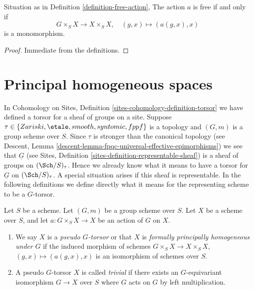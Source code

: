 \begin{lemma}
\label{lemma-free-action}
Situation as in Definition \ref{definition-free-action},
The action $a$ is free if and only if
$$
G \times_S X \to X \times_S X, \quad (g, x) \mapsto (a(g, x), x)
$$
is a monomorphism.
\end{lemma}

\begin{proof}
Immediate from the definitions.
\end{proof}






\section{Principal homogeneous spaces}
\label{section-principal-homogeneous}

\noindent
In
Cohomology on Sites, Definition \ref{sites-cohomology-definition-torsor}
we have defined a torsor for a sheaf of groups on a site.
Suppose $\tau \in \{Zariski, \etale, smooth, syntomic, fppf\}$ is a
topology and $(G, m)$ is a group scheme over $S$. Since $\tau$ is stronger than
the canonical topology (see
Descent, Lemma \ref{descent-lemma-fpqc-universal-effective-epimorphisms})
we see that $\underline{G}$ (see
Sites, Definition \ref{sites-definition-representable-sheaf})
is a sheaf of groups on $(\Sch/S)_\tau$.
Hence we already know what it means to have a
torsor for $\underline{G}$ on $(\Sch/S)_\tau$. A special situation
arises if this sheaf is representable. In the following definitions
we define directly what it means for the representing scheme to be a
$G$-torsor.

\begin{definition}
\label{definition-pseudo-torsor}
Let $S$ be a scheme.
Let $(G, m)$ be a group scheme over $S$.
Let $X$ be a scheme over $S$, and let
$a : G \times_S X \to X$ be an action of $G$ on $X$.
\begin{enumerate}
\item We say $X$ is a {\it pseudo $G$-torsor} or that $X$ is
{\it formally principally homogeneous under $G$} if the induced
morphism of schemes $G \times_S X \to X \times_S X$,
$(g, x) \mapsto (a(g, x), x)$ is an isomorphism of schemes over $S$.
\item A pseudo $G$-torsor $X$ is called {\it trivial} if there exists
an $G$-equivariant isomorphism $G \to X$ over $S$ where $G$ acts on
$G$ by left multiplication.
\end{enumerate}
\end{definition}

